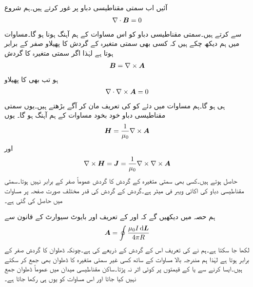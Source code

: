 
آئیں اب سمتی مقناطیسی دباو پر غور کرتے ہیں۔ہم شروع
\begin{align}\label{مساوات_مقناطیسی_پھیلاو_بہاو_صفر_ہے}
\nabla \cdot {\ensuremath{{\boldsymbol{B}}}}=0
\end{align}
سے کرتے ہیں۔سمتی مقناطیسی دباو کو اس مساوات کے ہم آہنگ ہونا ہو گا۔مساوات  میں ہم دیکھ چکے ہیں کہ کسی بھی سمتی متغیرہ کے گردش کا پھیلاو صفر کے برابر ہوتا ہے لہٰذا اگر  سمتی متغیرہ  کا گردش
\begin{align}\label{مساوات_مقناطیسی_سمتی_دباو_تعریف}
{\ensuremath{{\boldsymbol{B}}}}=\nabla \times {\ensuremath{{\boldsymbol{A}}}}
\end{align}
 ہو تب بھی  کا پھیلاو
\begin{align*}
\nabla \cdot \nabla \times {\ensuremath{{\boldsymbol{A}}}}=0
\end{align*}
ہی ہو گا۔ہم مساوات  میں دئے  کو  کی تعریف مان کر آگے بڑھتے ہیں۔یوں سمتی مقناطیسی دباو خود بخود مساوات  کے ہم آہنگ ہو گا۔  یوں
\begin{align*}
{\ensuremath{{\boldsymbol{H}}}}=\frac{1}{\mu_0} \nabla \times {\ensuremath{{\boldsymbol{A}}}}
\end{align*}
اور
\begin{align*}
\nabla \times {\ensuremath{{\boldsymbol{H}}}}={{\boldsymbol{J}}}=\frac{1}{\mu_0} \nabla \times \nabla \times {\ensuremath{{\boldsymbol{A}}}}
\end{align*}
حاصل ہوتے ہیں۔کسی بھی سمتی متغیرہ کے گردش کا گردش عموماً صفر کے برابر نہیں ہوتا۔سمتی مقناطیسی دباو  کی اکائی ویبر فی میٹر  ہے۔گردش کے گردش کی قدر مختلف صورت صفحہ  پر مساوات  میں حاصل کی گئی ہے۔

ہم حصہ  میں دیکھیں گے کہ  اور  کے تعریف اور بایوٹ سیوارٹ کے قانون سے
\begin{align}\label{مساوات_مقناطیسی_سمتی_دباو}
\kvec{A}=\oint \frac{\mu_0 I \dif \kvec{L}}{4\pi R}
\end{align}
لکھا جا سکتا ہے۔ہم نے  کی تعریف اس کے گردش کے ذریعے کی ہے۔چونکہ ڈھلوان کا گردش صفر کے برابر ہوتا ہے  لہٰذا ہم مندرجہ بالا مساوات کے ساتھ کسی غیر سمتی متغیرہ کا ڈھلوان بھی جمع کر سکتے ہیں۔ایسا کرنے سے  یا  کے قیمتوں پر کوئی اثر نہ پڑتا۔ساکن مقناطیسی میدان میں عموماً ڈھلوان جمع نہیں کیا جاتا اور اس مساوات کو یوں ہی رکھا جاتا ہے۔

